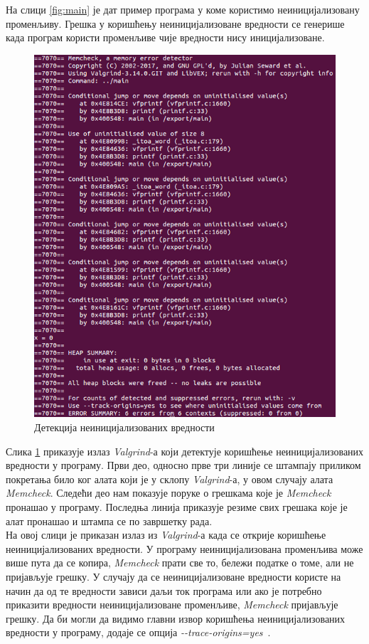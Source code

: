 \documentclass[12pt,oneside]{memoir}
\begin{document}
\indent На слици \ref{fig:main} је дат пример програма у коме користимо неиницијализовану променљиву. Грешка у коришћењу неиницијализоване вредности се генерише када програм користи променљиве чије вредности нису иницијализоване.

\begin{figure}[h!]
\begin{center}
\includegraphics[scale=0.75]{slika2.png}
\end{center}
\caption{Детекција неиницијализованих вредности}
\label{fig:memcheck}
\end{figure}

\indent Слика \ref{fig:memcheck} приказује излаз \textit{Valgrind}-а који детектује коришћење неиницијализованих вредности у програму. Први део, односно прве три линије се штампају приликом покретања било ког алата који је у склопу \textit{Valgrind}-а, у овом случају алата \textit{Memcheck}. Следећи део нам показује поруке о грешкама које је \textit{Memcheck} пронашао у програму. Последња линија приказује резиме свих грешака које је алат пронашао и штампа се по завршетку рада. \\
\indent На овој слици је приказан излаз из \textit{Valgrind}-а када се открије  коришћење неиницијализованих вредности. У програму неиницијализована променљива може више пута да се копира, \textit{Memcheck} прати све то, бележи податке о томе, али не пријављује грешку. У случају да се неиницијализоване вредности користе на начин да од те вредности зависи даљи ток програма или ако је потребно приказити вредности неиницијализоване променљиве, \textit{Memcheck} пријављује грешку. Да би могли да видимо главни извор коришћења неиницијализованих вредности у програму, додаје се опција \textit{-\--trace-origins=yes}~\cite{memcheckRef}.
\end{document}
